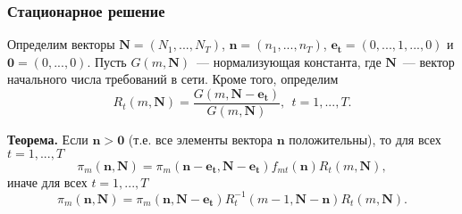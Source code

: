 
\begin{frame} \frametitle{Стационарное решение}
Определим векторы $\mathbf{N}=(N_1,...,N_T)$, $\mathbf{n}=(n_1,...,n_T)$, $\mathbf{e_t}=(0,...,1,...,0)$ и $\mathbf{0}=(0,...,0)$. Пусть $G(m,\mathbf{N})$~--- нормализующая константа, где $\mathbf{N}$~--- вектор начального числа требований в сети. Кроме того, определим
\begin{equation*}
R_t(m,\mathbf{N}) = \frac{G(m,\mathbf{N}-\mathbf{e_t})}{G(m,\mathbf{N})},~~t=1,...,T.
\end{equation*}

\textbf{Теорема.} Если $\mathbf{n} > \mathbf{0}$ (т.е. все элементы вектора $\mathbf{n}$ положительны), то для всех $t=1,...,T$
 \begin{equation}
  \pi_m(\mathbf{n},\mathbf{N}) = \pi_m(\mathbf{n}-\mathbf{e_t},\mathbf{N}-\mathbf{e_t})
  f_{mt}(\mathbf{n}) R_t(m,\mathbf{N}) ,
  \label{eq:10}
 \end{equation}
 иначе для всех $t=1,...,T$
  \begin{equation}
  \pi_m(\mathbf{n},\mathbf{N}) = \pi_m(\mathbf{n},\mathbf{N}-\mathbf{e_t}) R_t^{-1}(m-1,\mathbf{N}-\mathbf{n}) R_t(m,\mathbf{N}) .
  \label{eq:11}
 \end{equation}
\end{frame}


